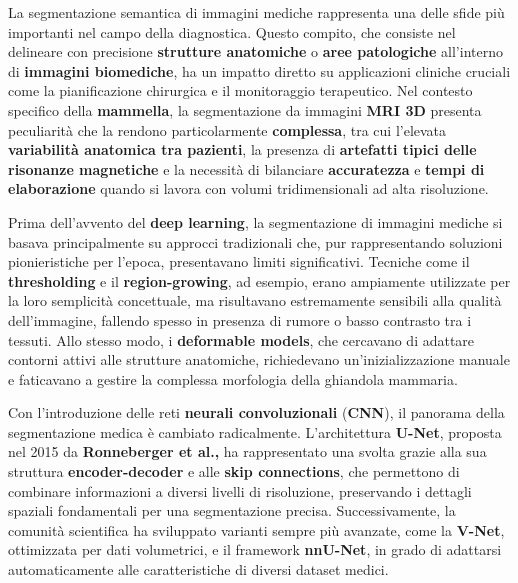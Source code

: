 

La segmentazione semantica di immagini mediche rappresenta una delle sfide più importanti nel campo della diagnostica. Questo compito, che consiste nel delineare con precisione \textbf{strutture anatomiche} o \textbf{aree patologiche} all’interno di \textbf{immagini biomediche}, ha un impatto diretto su applicazioni cliniche cruciali come la pianificazione chirurgica e il monitoraggio terapeutico. Nel contesto specifico della \textbf{mammella}, la segmentazione da immagini \textbf{MRI 3D} presenta peculiarità che la rendono particolarmente \textbf{complessa}, tra cui l’elevata \textbf{variabilità anatomica tra pazienti}, la presenza di \textbf{artefatti tipici delle risonanze magnetiche} e la necessità di bilanciare \textbf{accuratezza} e \textbf{tempi di elaborazione} quando si lavora con volumi tridimensionali ad alta risoluzione.


Prima dell’avvento del \textbf{deep learning}, la segmentazione di immagini mediche si basava principalmente su approcci tradizionali che, pur rappresentando soluzioni pionieristiche per l’epoca, presentavano limiti significativi. Tecniche come il \textbf{thresholding} e il \textbf{region-growing}, ad esempio, erano ampiamente utilizzate per la loro semplicità concettuale, ma risultavano estremamente sensibili alla qualità dell’immagine, fallendo spesso in presenza di rumore o basso contrasto tra i tessuti. Allo stesso modo, i \textbf{deformable models}, che cercavano di adattare contorni attivi alle strutture anatomiche, richiedevano un’inizializzazione manuale e faticavano a gestire la complessa morfologia della ghiandola mammaria.

Con l’introduzione delle reti \textbf{neurali convoluzionali} (\textbf{CNN}), il panorama della segmentazione medica è cambiato radicalmente. L’architettura \textbf{U-Net}, proposta nel 2015 da \textbf{Ronneberger et al.,} ha rappresentato una svolta grazie alla sua struttura \textbf{encoder-decoder} e alle \textbf{skip connections}, che permettono di combinare informazioni a diversi livelli di risoluzione, preservando i dettagli spaziali fondamentali per una segmentazione precisa. Successivamente, la comunità scientifica ha sviluppato varianti sempre più avanzate, come la \textbf{V-Net}, ottimizzata per dati volumetrici, e il framework \textbf{nnU-Net}, in grado di adattarsi automaticamente alle caratteristiche di diversi dataset medici.

